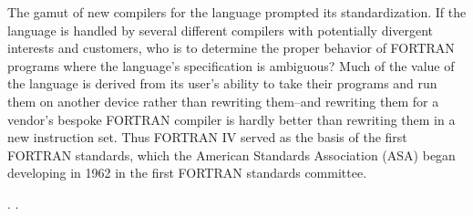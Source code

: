 The gamut of new compilers for the language prompted its standardization.
If the language is handled by several different compilers with potentially
divergent interests and customers, who is to determine the proper behavior
of FORTRAN programs where the language's specification is ambiguous?
Much of the value of the language is derived from its user's ability
to take their programs and run them on another device rather than
rewriting them--and rewriting them for a vendor's bespoke FORTRAN
compiler is hardly better than rewriting them in a new instruction set.
Thus FORTRAN IV served as the basis of the first FORTRAN standards,
which the American Standards Association (ASA) began developing in 1962
in the first FORTRAN standards committee.

.
\cite{backus_heising_fortran_1964}.
